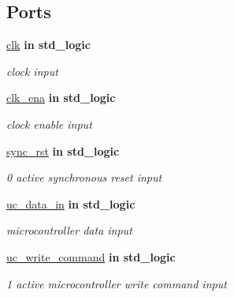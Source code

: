 \subsection*{Ports}
 \begin{DoxyCompactItemize}
\item 
\hyperlink{classflip__flop___r_w___r_c_a4a4609c199d30b3adebbeb3a01276ec5}{clk}  {\bfseries {\bfseries \textcolor{vhdlchar}{in}\textcolor{vhdlchar}{ }}} {\bfseries \textcolor{vhdlchar}{std\+\_\+logic}\textcolor{vhdlchar}{ }} 
\begin{DoxyCompactList}\small\item\em clock input \end{DoxyCompactList}\item 
\hyperlink{classflip__flop___r_w___r_c_a373faa4fdd1aebdfb0b95d5d53da4434}{clk\+\_\+ena}  {\bfseries {\bfseries \textcolor{vhdlchar}{in}\textcolor{vhdlchar}{ }}} {\bfseries \textcolor{vhdlchar}{std\+\_\+logic}\textcolor{vhdlchar}{ }} 
\begin{DoxyCompactList}\small\item\em clock enable input \end{DoxyCompactList}\item 
\hyperlink{classflip__flop___r_w___r_c_acb5ff599d2768c125faacfd9361063eb}{sync\+\_\+rst}  {\bfseries {\bfseries \textcolor{vhdlchar}{in}\textcolor{vhdlchar}{ }}} {\bfseries \textcolor{vhdlchar}{std\+\_\+logic}\textcolor{vhdlchar}{ }} 
\begin{DoxyCompactList}\small\item\em \textquotesingle{}0\textquotesingle{} active synchronous reset input \end{DoxyCompactList}\item 
\hyperlink{classflip__flop___r_w___r_c_aeb86d5268b7f0b59c74427f44096ffd5}{uc\+\_\+data\+\_\+in}  {\bfseries {\bfseries \textcolor{vhdlchar}{in}\textcolor{vhdlchar}{ }}} {\bfseries \textcolor{vhdlchar}{std\+\_\+logic}\textcolor{vhdlchar}{ }} 
\begin{DoxyCompactList}\small\item\em microcontroller data input \end{DoxyCompactList}\item 
\hyperlink{classflip__flop___r_w___r_c_adec7180b72b510c9b6576424bd7fde7e}{uc\+\_\+write\+\_\+command}  {\bfseries {\bfseries \textcolor{vhdlchar}{in}\textcolor{vhdlchar}{ }}} {\bfseries \textcolor{vhdlchar}{std\+\_\+logic}\textcolor{vhdlchar}{ }} 
\begin{DoxyCompactList}\small\item\em \textquotesingle{}1\textquotesingle{} active microcontroller write command input \end{DoxyCompactList}\item 

\end{DoxyCompactItemize}
